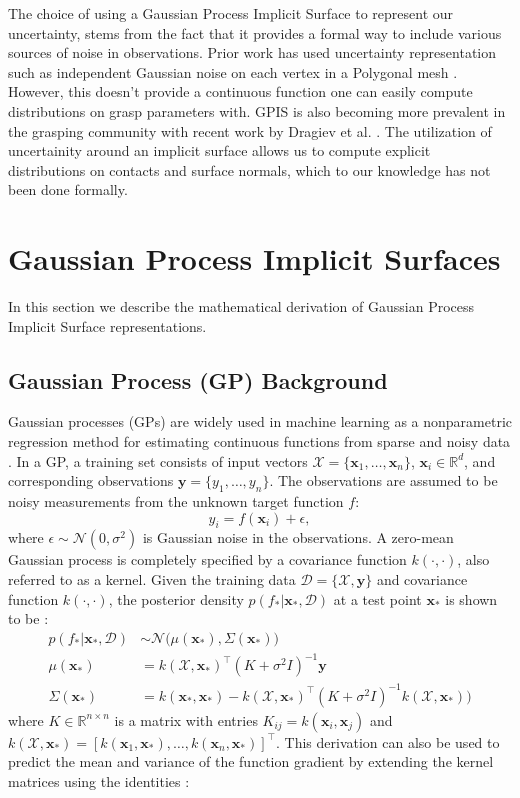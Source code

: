 \documentclass[letterpaper, 10 pt, conference]{ieeeconf}  %
\newcommand{\by}{\mathbf{y}}
\newcommand{\bx}{\mathbf{x}}
\newcommand{\mX}{\mathcal{X}}
\newcommand{\mD}{\mathcal{D}}
\newcommand{\mN}{\mathcal{N}}
\begin{document}
The choice of using a Gaussian Process Implicit Surface to represent our uncertainty, stems from the fact that it provides a formal way to include various sources of noise in observations. Prior work has used uncertainty representation such as independent Gaussian noise on each vertex in a Polygonal mesh \cite{kehoe2012toward}. However, this doesn't provide a continuous function one can easily compute distributions on grasp parameters with. GPIS is also becoming more prevalent in the grasping community with recent work by Dragiev et al. \cite{dragiev2011} . The utilization of uncertainity around an implicit surface allows us to compute explicit distributions on contacts and surface normals, which to our knowledge has not been done formally. 



\section{Gaussian Process Implicit Surfaces}

In this section we describe the mathematical derivation of Gaussian Process Implicit Surface representations.

\subsection{Gaussian Process (GP) Background}

Gaussian processes (GPs) are widely used in machine learning as a nonparametric regression method for estimating continuous functions from sparse and noisy data \cite{rasmussen2010gaussian}.
In a GP, a training set consists of input vectors $\mX = \{\bx_1, \ldots, \bx_n\}$, $\bx_i \in \mathbb{R}^d$, and corresponding observations $\by = \{y_1, \ldots, y_n\}$. The observations are assumed to be noisy measurements from the unknown target function $f$:
\begin{equation}
y_i = f(\bx_i) + \epsilon,
\end{equation}
where $\epsilon \sim \mN(0,\sigma^2)$ is Gaussian noise in the observations.
A zero-mean Gaussian process is completely specified by a covariance function $k(\cdot,\cdot)$, also referred to as a kernel.
Given the training data $\mD = \{\mX, \by\}$ and covariance function $k(\cdot,\cdot)$, the posterior density $p(f_*|\bx_*,\mD)$ at a test point $\bx_{*}$ is shown to be \cite{rasmussen2010gaussian}:
\begin{align}
	p(f_*|\bx_*,\mD) &\sim \mN\big(\mu(\bx_*), \Sigma(\bx_*)\big) \label{eq:GPposterior} \\
	\mu(\bx_*) &= k(\mX,\bx_*)^{\intercal}(K + \sigma^2I)^{-1}\by \label{eq:GPmean} \\
	\Sigma(\bx_*) &= k(\bx_*,\bx_*)-k(\mX,\bx_*)^{\intercal}(K+\sigma^2I)^{-1}k(\mX,\bx_*)\big) \label{eq:GPvar}
\end{align}
where $K \in \mathbb{R}^{n \times n}$ is a matrix with entries $K_{ij} = k(\bx_i,\bx_j)$ and $k(\mX,\bx_*) = [k(\bx_1,\bx_*),\ldots,k(\bx_n,\bx_*)]^{\intercal}$. 
This derivation can also be used to predict the mean and variance of the function gradient by extending the kernel matrices using the identities \cite{solak2003derivative}:
\end{document}
